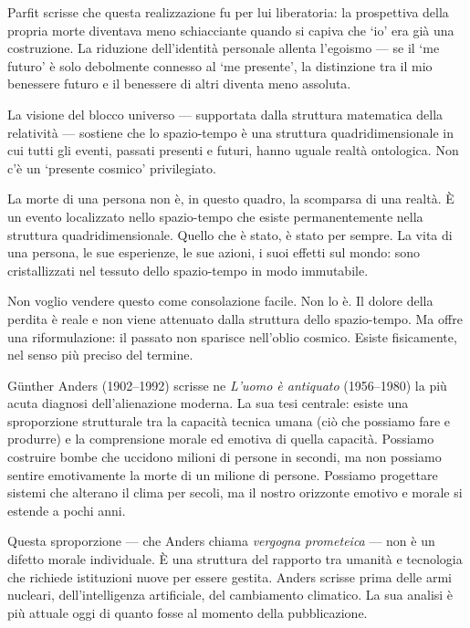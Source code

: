 \documentclass[12pt,a4paper,openany]{book}
\newcommand{\sezione}[1]{\vspace{1.2em}{\large\bfseries #1}\vspace{0.5em}\par}
\begin{document}
Parfit scrisse che questa realizzazione fu per lui liberatoria: la prospettiva della propria morte diventava meno schiacciante quando si capiva che `io' era già una costruzione. La riduzione dell'identità personale allenta l'egoismo — se il `me futuro' è solo debolmente connesso al `me presente', la distinzione tra il mio benessere futuro e il benessere di altri diventa meno assoluta.

\sezione{Il blocco universo e la permanenza del passato}

La visione del blocco universo — supportata dalla struttura matematica della relatività — sostiene che lo spazio-tempo è una struttura quadridimensionale in cui tutti gli eventi, passati presenti e futuri, hanno uguale realtà ontologica. Non c'è un `presente cosmico' privilegiato.

La morte di una persona non è, in questo quadro, la scomparsa di una realtà. È un evento localizzato nello spazio-tempo che esiste permanentemente nella struttura quadridimensionale. Quello che è stato, è stato per sempre. La vita di una persona, le sue esperienze, le sue azioni, i suoi effetti sul mondo: sono cristallizzati nel tessuto dello spazio-tempo in modo immutabile.

Non voglio vendere questo come consolazione facile. Non lo è. Il dolore della perdita è reale e non viene attenuato dalla struttura dello spazio-tempo. Ma offre una riformulazione: il passato non sparisce nell'oblio cosmico. Esiste fisicamente, nel senso più preciso del termine.

\sezione{Günther Anders e la sproporzione}

Günther Anders (1902--1992) scrisse ne \textit{L'uomo è antiquato} (1956--1980) la più acuta diagnosi dell'alienazione moderna. La sua tesi centrale: esiste una sproporzione strutturale tra la capacità tecnica umana (ciò che possiamo fare e produrre) e la comprensione morale ed emotiva di quella capacità. Possiamo costruire bombe che uccidono milioni di persone in secondi, ma non possiamo sentire emotivamente la morte di un milione di persone. Possiamo progettare sistemi che alterano il clima per secoli, ma il nostro orizzonte emotivo e morale si estende a pochi anni.

Questa sproporzione — che Anders chiama \textit{vergogna prometeica} — non è un difetto morale individuale. È una struttura del rapporto tra umanità e tecnologia che richiede istituzioni nuove per essere gestita. Anders scrisse prima delle armi nucleari, dell'intelligenza artificiale, del cambiamento climatico. La sua analisi è più attuale oggi di quanto fosse al momento della pubblicazione.
\end{document}
